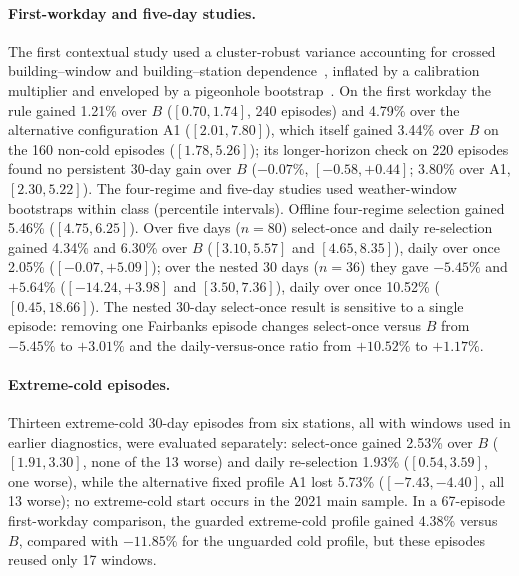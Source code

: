 \paragraph{First-workday and five-day studies.}
The first contextual study used a cluster-robust variance accounting for crossed building--window and building--station
dependence~\cite{cameron2011multiway}, inflated by a calibration multiplier and enveloped by a pigeonhole
bootstrap~\cite{owen2007pigeonhole}. On the first workday the rule gained 1.21\% over $B$ ($[0.70, 1.74]$, 240 episodes) and 4.79\% over the
alternative configuration A1 ($[2.01, 7.80]$), which itself gained 3.44\% over $B$ on the 160 non-cold episodes ($[1.78, 5.26]$);
its longer-horizon check on 220 episodes found no persistent 30-day gain over $B$ ($-0.07\%$, $[-0.58, +0.44]$; 3.80\% over
A1, $[2.30, 5.22]$). The four-regime and five-day studies used weather-window bootstraps within class (percentile intervals).
Offline four-regime selection gained 5.46\% ($[4.75, 6.25]$). Over five days ($n=80$) select-once and daily re-selection gained
4.34\% and 6.30\% over $B$ ($[3.10, 5.57]$ and $[4.65, 8.35]$), daily over once 2.05\% ($[-0.07, +5.09]$); over the nested
30 days ($n=36$) they gave $-5.45\%$ and $+5.64\%$ ($[-14.24, +3.98]$ and $[3.50, 7.36]$), daily over once 10.52\%
($[0.45, 18.66]$). The nested 30-day select-once result is sensitive to a single episode: removing one Fairbanks
episode changes select-once versus $B$ from $-5.45\%$ to $+3.01\%$ and the daily-versus-once ratio from $+10.52\%$ to
$+1.17\%$.

\paragraph{Extreme-cold episodes.}
Thirteen extreme-cold 30-day episodes from six stations, all with windows used in earlier diagnostics, were evaluated
separately: select-once gained 2.53\% over $B$ ($[1.91, 3.30]$, none of the 13 worse) and daily re-selection 1.93\%
($[0.54, 3.59]$, one worse), while the alternative fixed profile A1 lost 5.73\% ($[-7.43, -4.40]$, all 13 worse); no
extreme-cold start occurs in the 2021 main sample. In a 67-episode first-workday
comparison, the guarded extreme-cold profile gained 4.38\% versus $B$, compared with $-11.85\%$ for the unguarded cold
profile, but these episodes reused only 17 windows.


